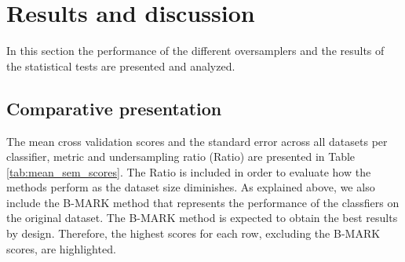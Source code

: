 \documentclass[10pt,letterpaper]{article}
\begin{document}
\section{Results and discussion}
\label{results}

In this section the performance of the different oversamplers and the results 
of the statistical tests are presented and analyzed.

\subsection{Comparative presentation}

The mean cross validation scores and the standard error across all datasets per classifier, metric and undersampling ratio (Ratio) are presented in Table \ref{tab:mean_sem_scores}. The Ratio is included in order to evaluate how the methods perform as the dataset size diminishes. As explained above, we also include the B-MARK method that represents the performance of the classfiers on the original dataset. The B-MARK method is expected to obtain the best results by design. Therefore, the highest scores for each row, excluding the B-MARK scores, are highlighted.
\end{document}

